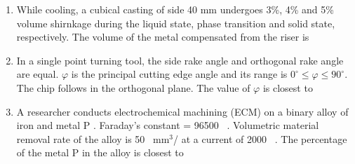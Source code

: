 \documentclass[journal]{IEEEtran}
\numberwithin{equation}{enumi}
\numberwithin{figure}{enumi}
\begin{document}
\begin{enumerate}
\begin{enumerate}
    
\end{enumerate}
\item While cooling, a cubical casting of side 40 mm undergoes 3\%, 4\% and 5\% volume shirnkage during the liquid state, phase transition and solid state, respectively. The volume of the metal compensated from the riser is
\begin{enumerate}
   
\end{enumerate}
\item In a single point turning tool, the side rake angle and orthogonal rake angle are equal. $\varphi$ is the principal cutting edge angle and its range is $0^{\circ}\leq\varphi\leq90^{\circ}$. The chip follows in the orthogonal plane. The value of $\varphi$ is closest to
\begin{enumerate}
   
\end{enumerate}
\item A researcher conducts electrochemical machining (ECM) on a binary alloy of iron  and metal P . Faraday's constant = 96500 \, . Volumetric material removal rate of the alloy is 50 \, $\text{mm}^3$/ at a current of 2000 \, . The percentage of the metal P in the alloy is closest to


\end{enumerate}
\end{document}
